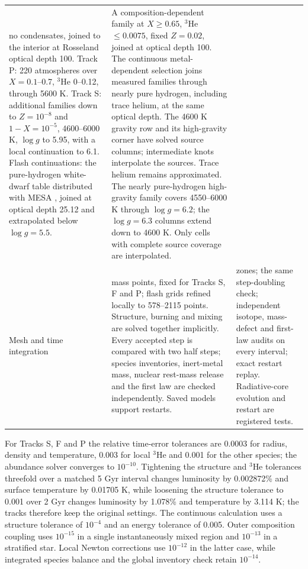 {\begin{longtable}{@{}>{\raggedright\arraybackslash}p{}>{\raggedright\arraybackslash}p{}>{\raggedright\arraybackslash}p{}@{}}
no condensates, joined to the interior at Rosseland optical depth 100.
Track P: 220 atmospheres over $X=0.1$--0.7, $^3$He 0--0.12, through
5600 K. Track S: additional families down to $Z=10^{-8}$ and $1-X=10^{-5}$,
4600--6000 K, $\log g$ to 5.95, with a local continuation to 6.1. Flash
continuations: the pure-hydrogen white-dwarf table distributed with MESA
\cite{rohrmann11,mesa_atm}, joined at optical depth 25.12 and extrapolated
below $\log g=5.5$. & A composition-dependent family at $X\geq0.65$,
$^3$He $\leq0.0075$, fixed $Z=0.02$, joined at optical depth 100. The
continuous metal-dependent selection joins measured families through
nearly pure hydrogen, including trace helium, at the same optical depth.
The 4600 K gravity row and its high-gravity corner have solved source
columns; intermediate knots interpolate the sources. Trace helium remains
approximated. The nearly pure-hydrogen high-gravity family covers
4550--6000 K through $\log g=6.2$; the $\log g=6.3$ columns extend down
to 4600 K. Only cells with complete source coverage are interpolated. \\[4pt]
Mesh and time integration & 512 mass points, fixed for Tracks S, F and P;
flash grids refined locally to 578--2115 points. Structure, burning and
mixing are solved together implicitly. Every accepted step is compared with
two half steps; species inventories, inert-metal mass, nuclear rest-mass
release and the first law are checked independently. Saved models support restarts. & 512 zones; the same step-doubling check; independent isotope,
mass-defect and first-law audits on every interval; exact restart replay.
Radiative-core evolution and restart are registered tests. \\
\bottomrule
\end{longtable}}

For Tracks S, F and P the relative time-error tolerances are 0.0003 for radius, density and
temperature, 0.003 for local $^3$He and 0.001 for the other species; the
abundance solver converges to $10^{-10}$. Tightening the structure and
$^3$He tolerances threefold over a matched 5 Gyr interval changes luminosity
by 0.002872\% and surface temperature by 0.01705 K, while loosening the
structure tolerance to 0.001 over 2 Gyr changes luminosity by 1.078\% and
temperature by 3.114 K; the tracks therefore keep the original settings.
The continuous calculation uses a structure tolerance of $10^{-4}$ and an
energy tolerance of 0.005. Outer composition coupling uses $10^{-15}$
in a single instantaneously mixed region and $10^{-13}$ in a stratified
star. Local Newton corrections use $10^{-12}$ in the latter case, while
integrated species balance and the global inventory check retain $10^{-14}$.

